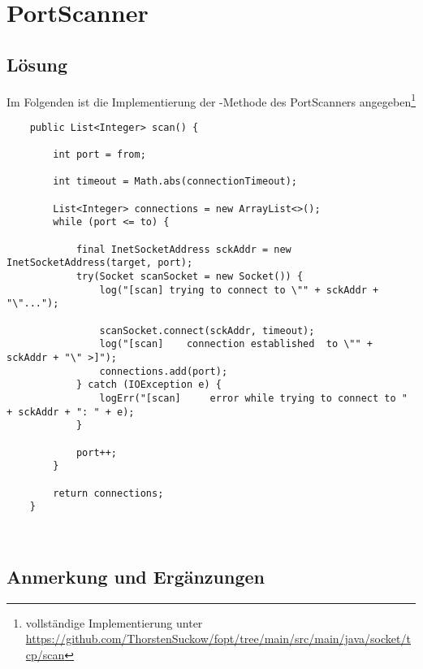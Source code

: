\section{PortScanner}\label{ch:portscanner}


\subsection{Lösung}

Im Folgenden ist die Implementierung der -Methode des PortScanners angegeben\footnote{
vollständige Implementierung unter \url{https://github.com/ThorstenSuckow/fopt/tree/main/src/main/java/socket/tcp/scan}
}

\begin{verbatim}
    public List<Integer> scan() {

        int port = from;

        int timeout = Math.abs(connectionTimeout);

        List<Integer> connections = new ArrayList<>();
        while (port <= to) {

            final InetSocketAddress sckAddr = new InetSocketAddress(target, port);
            try(Socket scanSocket = new Socket()) {
                log("[scan] trying to connect to \"" + sckAddr + "\"...");

                scanSocket.connect(sckAddr, timeout);
                log("[scan]    connection established  to \"" + sckAddr + "\" >]");
                connections.add(port);
            } catch (IOException e) {
                logErr("[scan]     error while trying to connect to " + sckAddr + ": " + e);
            }

            port++;
        }

        return connections;
    }
\end{verbatim}\\


\subsection{Anmerkung und Ergänzungen}




